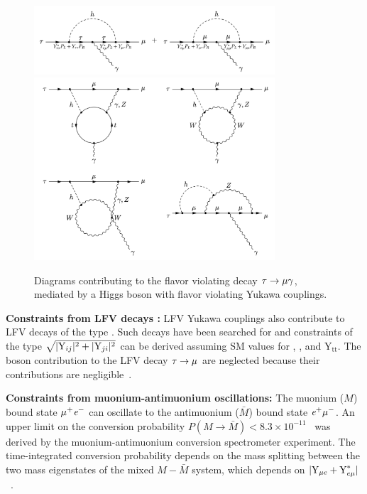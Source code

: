 \begin{figure}[htbp]
  \centering
  \includegraphics[width=0.8\textwidth]{plots/chapter2/1loop.png} \\
  \includegraphics[width=0.8\textwidth]{plots/chapter2/2loop.png}
  \caption{Diagrams contributing to the flavor violating decay $\tau \to \mu \gamma$, mediated by a Higgs boson with flavor violating Yukawa couplings.}
  \label{fig:tmg}
\end{figure}

\textbf{Constraints from LFV decays \ltl:} LFV Yukawa couplings also contribute to LFV decays of the type \ltl. Such decays have been searched for and constraints of the type $\sqrt{|\text{Y}_{ij}|^2+|\text{Y}_{ji}|^2}$ can be derived assuming SM values for \Ytt, \Ymm, and $\text{Y}_{\text{tt}}$. The \PZ boson contribution to the LFV decay $\tau \to \mu$ are neglected because their contributions are negligible~\cite{Goto:2015iha}.

\textbf{Constraints from muonium-antimuonium oscillations:} The muonium ($M$) bound state $\mu^{+} \textit{e}^{-}$ can oscillate to the antimuonium ($\bar{M}$) bound state $\textit{e}^{+} \mu^{-}$. An upper limit on the conversion probability $P(M \to \bar{M}) < 8.3 \times 10^{-11}$~\cite{Willmann:1998gd} was derived by the muonium-antimuonium conversion spectrometer experiment. The time-integrated conversion probability depends on the mass splitting between the two mass eigenstates of the mixed $M-\bar{M}$ system, which depends on $|\text{Y}_{\mu e}+\text{Y}_{e \mu}^{*}|$~\cite{Harnik:2012pb}.

